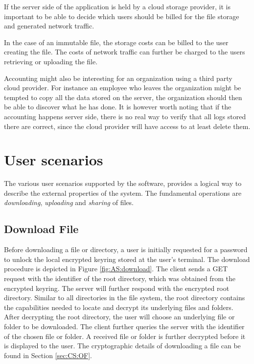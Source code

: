 \documentclass[pdftex,english,10pt,b5paper,twoside]{book}
\begin{document}
If the server side of the application is held by a cloud storage provider, it is
important to be able to decide which users should be billed for the file storage
and generated network traffic. 

In the case of an immutable file, the storage costs can be billed to the user
creating the file. The costs of network traffic can further be charged to the
users retrieving or uploading the file.

Accounting might also be interesting for an organization using a third party
cloud provider. For instance an employee who leaves the organization might be
tempted to copy all the data stored on the server, the organization should then
be able to discover what he has done. It is however worth noting that if the
accounting happens server side, there is no real way to verify that all logs
stored there are correct, since the cloud provider will have access to at least
delete them.

\section{User scenarios}

The various user scenarios supported by the software, provides a logical way to
describe the external properties of the system. The fundamental operations are
\emph{downloading}, \emph{uploading} and \emph{sharing} of files.

\subsection{Download File}

Before downloading a file or directory, a user is initially requested for a
password to unlock the local encrypted keyring stored at the user's
terminal. The download procedure is depicted in Figure \ref{fig:AS:download}.
The client sends a GET request with the identifier of the root directory, which
was obtained from the encrypted keyring. The server will further respond with the
encrypted root directory. Similar to all directories in the file system, the
root directory contains the capabilities needed to locate and decrypt its
underlying files and folders. After decrypting the root directory, the user will
choose an underlying file or folder to be downloaded. The client
further queries the server with the identifier of the chosen file or folder.
A received file or folder is further decrypted before it is displayed to the
user. The cryptographic details of downloading a file can be found in Section
\ref{sec:CS:OF}.
\end{document}
